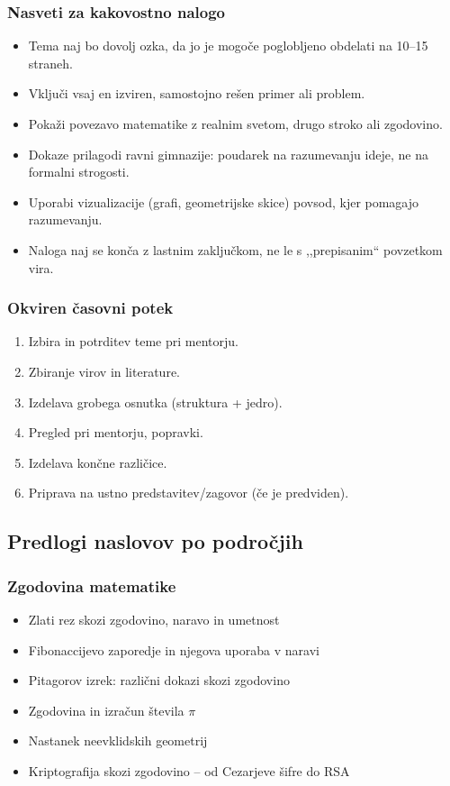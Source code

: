 \documentclass[11pt,a4paper]{article}
\begin{document}
\subsubsection*{Nasveti za kakovostno nalogo}

\begin{itemize}
  \item Tema naj bo dovolj ozka, da jo je mogoče poglobljeno obdelati na 10--15 straneh.
  \item Vključi vsaj en izviren, samostojno rešen primer ali problem.
  \item Pokaži povezavo matematike z realnim svetom, drugo stroko ali zgodovino.
  \item Dokaze prilagodi ravni gimnazije: poudarek na razumevanju ideje, ne na formalni strogosti.
  \item Uporabi vizualizacije (grafi, geometrijske skice) povsod, kjer pomagajo razumevanju.
  \item Naloga naj se konča z lastnim zaključkom, ne le s ,,prepisanim`` povzetkom vira.
\end{itemize}

\subsubsection*{Okviren časovni potek}

\begin{enumerate}
  \item Izbira in potrditev teme pri mentorju.
  \item Zbiranje virov in literature.
  \item Izdelava grobega osnutka (struktura + jedro).
  \item Pregled pri mentorju, popravki.
  \item Izdelava končne različice.
  \item Priprava na ustno predstavitev/zagovor (če je predviden).
\end{enumerate}

\subsection{Predlogi naslovov po področjih}

\subsubsection*{Zgodovina matematike}
\begin{itemize}
  \item Zlati rez skozi zgodovino, naravo in umetnost
  \item Fibonaccijevo zaporedje in njegova uporaba v naravi
  \item Pitagorov izrek: različni dokazi skozi zgodovino
  \item Zgodovina in izračun števila $\pi$
  \item Nastanek neevklidskih geometrij
  \item Kriptografija skozi zgodovino -- od Cezarjeve šifre do RSA
\end{itemize}
\end{document}
